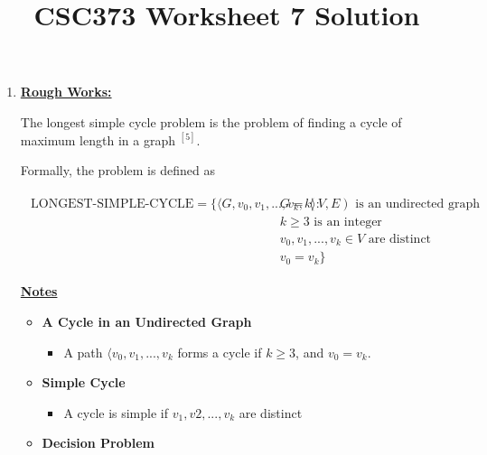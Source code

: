 \documentclass[12pt]{article}
\begin{document}
\title{CSC373 Worksheet 7 Solution}
\maketitle

\bigskip

\begin{enumerate}[1.]
    \item

    \bigskip

    \underline{\textbf{Rough Works:}}

    \bigskip

    The longest simple cycle problem is the problem of finding a cycle of maximum
    length in a graph $^{[5]}$.

    \bigskip

    Formally, the problem is defined as

    \begin{align*}
        \begin{split}
            \text{LONGEST-SIMPLE-CYCLE} = \{\langle G,v_0,v_1,...,v_k,k\rangle: &\text{$G = (V,E)$ is an undirected graph}\\
            &\text{$k \geq 3$ is an integer}\\
            &\text{$v_0,v_1,...,v_k \in V$ are distinct}\\
            &\text{$v_0 = v_k$}\}
        \end{split}
    \end{align*}

    \underline{\textbf{Notes}}

    \begin{itemize}
        \item \textbf{A Cycle in an Undirected Graph}

        \begin{itemize}
            \item A path $\langle v_0,v_1,...,v_k$ forms a cycle if $k \geq 3$, and $v_0 = v_k$.
        \end{itemize}

        \item \textbf{Simple Cycle}

        \begin{itemize}
            \item A cycle is simple if $v_1, v2, ..., v_k$ are distinct
        \end{itemize}
        \item \textbf{Decision Problem}


\end{itemize}
\end{enumerate}
\end{document}
